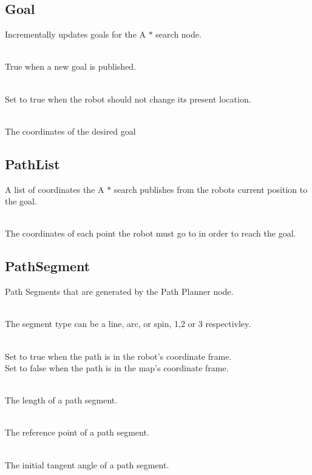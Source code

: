 \subsection{Goal}
Incrementally updates goals for the A $\ast$ search node.

\\
\indent True when a new goal is published.

\\
\indent Set to true when the robot should not change its present location.

\\
\indent The coordinates of the desired goal

\subsection{PathList}
A list of coordinates the A $\ast$ search publishes from the robots current position to the goal.

\\
\indent The coordinates of each point the robot must go to in order to reach the goal.

\subsection{PathSegment}
Path Segments that are generated by the Path Planner node.

\\
\indent The segment type can be a line, arc, or spin, 1,2 or 3 respectivley.

\\
\indent Set to true when the path is in the robot's coordinate frame.\\
\indent Set to false when the path is in the map's coordinate frame.

\\
\indent The length of a path segment.

\\
\indent The reference point of a path segment.

\\
\indent The initial tangent angle of a path segment.

